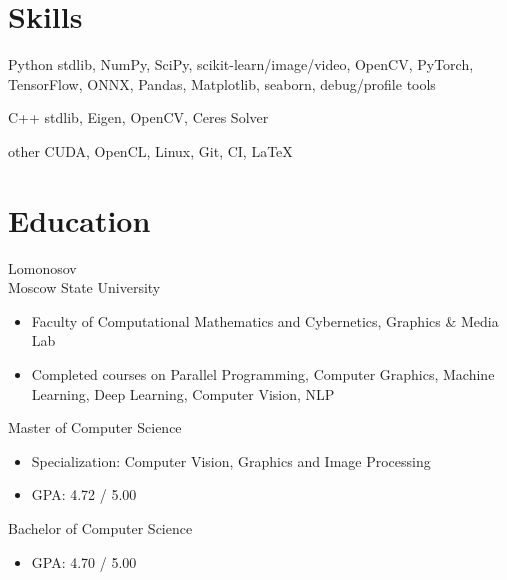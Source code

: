 \documentclass{tccv}
\begin{document}
\section{Skills}

\begin{factlist}

\item{Python}
     {stdlib, NumPy, SciPy, scikit-learn/image/video, OpenCV, PyTorch, TensorFlow, ONNX, Pandas, Matplotlib, seaborn, debug/profile tools}

\item{C++}
     {stdlib, Eigen, OpenCV, Ceres Solver}

\item{other}
     {CUDA, OpenCL, Linux, Git, CI, \LaTeX}

\end{factlist}
\vfill

\section{Education}

\begin{eventlist}

\evententry{}
     {Lomonosov\\Moscow State University}
     {}
\vspace{-10pt}
\begin{itemize}
     \item Faculty of Computational Mathematics and Cybernetics, Graphics \& Media Lab
     \item Completed courses on Parallel Programming, Computer Graphics, Machine Learning, Deep Learning, Computer Vision, NLP
\end{itemize}

     {}
     {Master of Computer Science}
\begin{itemize}
     \item Specialization: Computer Vision, Graphics and Image Processing
     \item GPA: 4.72 / 5.00
\end{itemize}

     {}
     {Bachelor of Computer Science}
\begin{itemize}
     \item GPA: 4.70 / 5.00
\end{itemize}

\end{eventlist}
\end{document}
